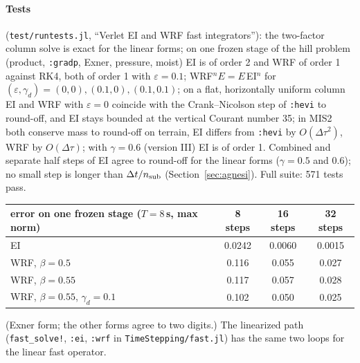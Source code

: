 \documentclass[11pt,a4paper]{article}
\newcommand{\dtau}{\Delta\tau}
\newcommand{\code}[1]{\texttt{\small #1}}
\begin{document}
\paragraph{Tests} (\code{test/runtests.jl}, ``Verlet EI and WRF fast integrators''): the two-factor
column solve is exact for the linear forms; on one frozen stage of the hill problem (product,
\code{:gradp}, Exner, pressure, moist) EI is of order 2 and WRF of order 1 against RK4, both of order 1 with
$\varepsilon=0.1$; WRF$^n E=E\,$EI$^n$ for $(\varepsilon,\gamma_d)=(0,0),(0.1,0),(0.1,0.1)$; on a flat, horizontally uniform
column EI and WRF with $\varepsilon=0$ coincide with the Crank--Nicolson step of \code{:hevi} to round-off, and EI stays
bounded at the vertical Courant number 35; in MIS2 both conserve mass to round-off on terrain, EI differs
from \code{:hevi} by $O(\dtau^2)$, WRF by $O(\dtau)$; with $\gamma=0.6$ (version III) EI is of order 1. Combined and separate half steps of EI agree to round-off for the linear forms ($\gamma=0.5$
and 0.6); no small step is longer than $\Delta t/n_{\rm sub}$ (Section~\ref{sec:agnesi}). Full suite: 571 tests pass.
\begin{center}\small
\begin{tabular}{lccc}\toprule
error on one frozen stage ($T=8$\,s, max norm) & 8 steps & 16 steps & 32 steps\\\midrule
EI & 0.0242 & 0.0060 & 0.0015\\
WRF, $\beta=0.5$ & 0.116 & 0.055 & 0.027\\
WRF, $\beta=0.55$ & 0.117 & 0.057 & 0.028\\
WRF, $\beta=0.55$, $\gamma_d=0.1$ & 0.102 & 0.050 & 0.025\\\bottomrule
\end{tabular}
\end{center}
(Exner form; the other forms agree to two digits.) The linearized path (\code{fast\_solve!},
\code{:ei}, \code{:wrf} in \code{TimeStepping/fast.jl}) has the same two loops for the linear fast operator.

\end{document}
